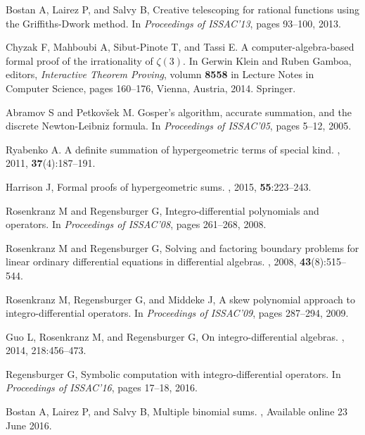 \documentclass{jssc}
\begin{document}
\begin{thebibliography}{100}
 Bostan A,  Lairez P, and  Salvy B,
\newblock Creative telescoping for rational functions using the
  {G}riffiths-{D}work method.
\newblock In {\it Proceedings of ISSAC'13}, pages 93--100, 2013.

 Chyzak F, Mahboubi A, Sibut-Pinote T, and Tassi E.
\newblock A computer-algebra-based formal proof of the irrationality of
  $\zeta(3)$.
\newblock In Gerwin Klein and Ruben Gamboa, editors, {\it Interactive Theorem
  Proving}, volumn  {\bf 8558} in Lecture Notes in Computer Science, pages 160--176,
  Vienna, Austria, 2014. Springer.

Abramov S and Petkov{\v s}ek M.
\newblock Gosper's algorithm, accurate summation, and the discrete
  {N}ewton-{L}eibniz formula.
\newblock In {\it Proceedings of ISSAC'05}, pages 5--12, 2005.

 Ryabenko A.
\newblock A definite summation of hypergeometric terms of special kind.
, 2011, {\bf 37}(4):187--191.

Harrison J,
\newblock Formal proofs of hypergeometric sums.
, 2015, {\bf 55}:223--243.

 Rosenkranz M and  Regensburger G,
\newblock Integro-differential polynomials and operators.
\newblock In {\it Proceedings of ISSAC'08}, pages 261--268, 2008.

 Rosenkranz M and  Regensburger G,
\newblock Solving and factoring boundary problems for linear ordinary
  differential equations in differential algebras.
, 2008, {\bf 43}(8):515--544.

 Rosenkranz M, Regensburger G, and   Middeke J,
\newblock A skew polynomial approach to integro-differential operators.
\newblock In {\it Proceedings of ISSAC'09}, pages 287--294, 2009.

 Guo L,  Rosenkranz M, and Regensburger G,
\newblock On integro-differential algebras.
, 2014, 218:456--473.

Regensburger G,
\newblock Symbolic computation with integro-differential operators.
\newblock In {\it Proceedings of ISSAC'16}, pages 17--18, 2016.

Bostan A, Lairez P, and Salvy B,
\newblock Multiple binomial sums.
,
Available online 23 June 2016.



\end{thebibliography}
\end{document}

